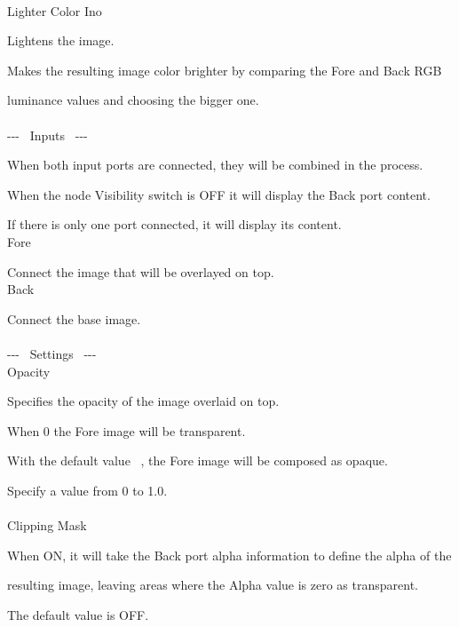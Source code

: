 \documentclass[a4paper,12pt]{article}
\begin{document}
\thispagestyle{empty}

\Large
\noindent \\
Lighter Color Ino\medskip
\par
\normalsize
Lightens the image.\par
Makes the resulting image color brighter by comparing the Fore and Back RGB\par 
luminance values and choosing the bigger one.\\
\\
-{-}- \ Inputs \ -{-}-\par
When both input ports are connected, they will be combined in the process.\par
When the node Visibility switch is OFF it will display the Back port content.\par
If there is only one port connected, it will display its content.\\
Fore\par
Connect the image that will be overlayed on top.\\
Back\par
Connect the base image.\\
\\
-{-}- \ Settings \ -{-}-\\
Opacity\par
Specifies the opacity of the image overlaid on top.\par
When 0 the Fore image will be transparent.\par
With the default value \textquotedbl \ , the Fore image will be composed as opaque.\par
Specify a value from 0 to 1.0.\\
\\
Clipping Mask\par
When ON, it will take the Back port alpha information to define the alpha of the\par
resulting image, leaving areas where the Alpha value is zero as transparent.\par
The default value is OFF.
\end{document}

